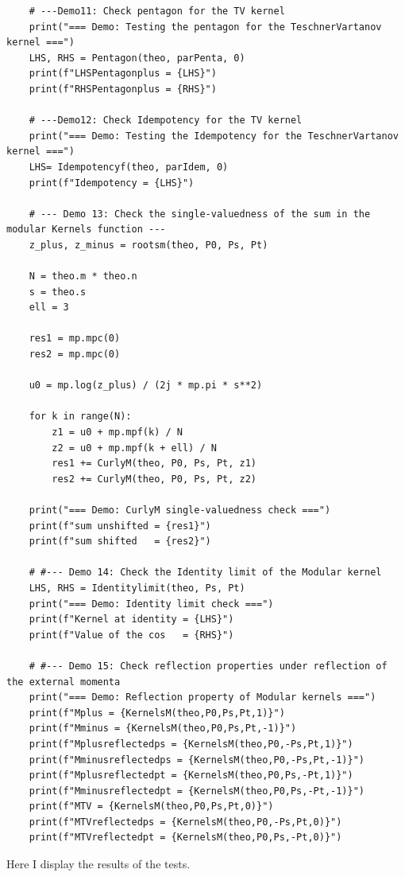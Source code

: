 \documentclass[11pt]{article}
\begin{document}
\begin{lstlisting}
    # ---Demo11: Check pentagon for the TV kernel
    print("=== Demo: Testing the pentagon for the TeschnerVartanov kernel ===")
    LHS, RHS = Pentagon(theo, parPenta, 0)
    print(f"LHSPentagonplus = {LHS}")
    print(f"RHSPentagonplus = {RHS}")

    # ---Demo12: Check Idempotency for the TV kernel
    print("=== Demo: Testing the Idempotency for the TeschnerVartanov kernel ===")
    LHS= Idempotencyf(theo, parIdem, 0)
    print(f"Idempotency = {LHS}")

    # --- Demo 13: Check the single-valuedness of the sum in the modular Kernels function ---
    z_plus, z_minus = rootsm(theo, P0, Ps, Pt)

    N = theo.m * theo.n
    s = theo.s
    ell = 3

    res1 = mp.mpc(0)
    res2 = mp.mpc(0)

    u0 = mp.log(z_plus) / (2j * mp.pi * s**2)

    for k in range(N):
        z1 = u0 + mp.mpf(k) / N
        z2 = u0 + mp.mpf(k + ell) / N
        res1 += CurlyM(theo, P0, Ps, Pt, z1)
        res2 += CurlyM(theo, P0, Ps, Pt, z2)

    print("=== Demo: CurlyM single-valuedness check ===")
    print(f"sum unshifted = {res1}")
    print(f"sum shifted   = {res2}")

    # #--- Demo 14: Check the Identity limit of the Modular kernel
    LHS, RHS = Identitylimit(theo, Ps, Pt)
    print("=== Demo: Identity limit check ===")
    print(f"Kernel at identity = {LHS}")
    print(f"Value of the cos   = {RHS}")

    # #--- Demo 15: Check reflection properties under reflection of the external momenta
    print("=== Demo: Reflection property of Modular kernels ===")
    print(f"Mplus = {KernelsM(theo,P0,Ps,Pt,1)}")
    print(f"Mminus = {KernelsM(theo,P0,Ps,Pt,-1)}")
    print(f"Mplusreflectedps = {KernelsM(theo,P0,-Ps,Pt,1)}")
    print(f"Mminusreflectedps = {KernelsM(theo,P0,-Ps,Pt,-1)}")
    print(f"Mplusreflectedpt = {KernelsM(theo,P0,Ps,-Pt,1)}")
    print(f"Mminusreflectedpt = {KernelsM(theo,P0,Ps,-Pt,-1)}")
    print(f"MTV = {KernelsM(theo,P0,Ps,Pt,0)}")
    print(f"MTVreflectedps = {KernelsM(theo,P0,-Ps,Pt,0)}")
    print(f"MTVreflectedpt = {KernelsM(theo,P0,Ps,-Pt,0)}")

\end{lstlisting}
Here I display the results of the tests.
\end{document}
